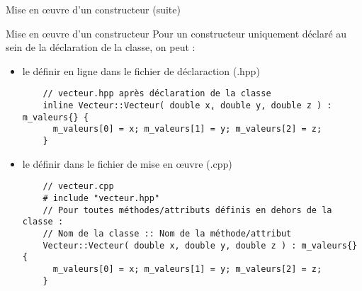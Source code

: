 \documentclass[compress,10pt,aspectratio=169]{beamer}
\begin{document}
    \begin{frame}[fragile]{Mise en {\oe}uvre d'un constructeur (suite)}
    \scriptsize
    \begin{block}{\small Mise en {\oe}uvre d'un constructeur}
    Pour un constructeur uniquement déclaré au sein de la déclaration de la classe, on peut :
    \begin{itemize}
    \item le définir en ligne dans le fichier de déclaraction (.hpp) 
    \begin{verbatim}
    // vecteur.hpp après déclaration de la classe
    inline Vecteur::Vecteur( double x, double y, double z ) : m_valeurs{} {
      m_valeurs[0] = x; m_valeurs[1] = y; m_valeurs[2] = z;
    }
    \end{verbatim}
    \item le définir dans le fichier de mise en {\oe}uvre (.cpp)
    \begin{verbatim}
    // vecteur.cpp
    # include "vecteur.hpp"
    // Pour toutes méthodes/attributs définis en dehors de la classe :
    // Nom de la classe :: Nom de la méthode/attribut
    Vecteur::Vecteur( double x, double y, double z ) : m_valeurs{} {
      m_valeurs[0] = x; m_valeurs[1] = y; m_valeurs[2] = z;
    }
    \end{verbatim}
    \end{itemize}
    \end{block}
    \end{frame}
      
\end{document}

